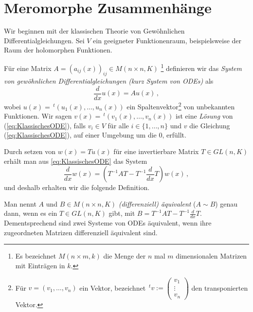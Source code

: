 \chapter{Meromorphe Zusammenhänge}
\begin{comment}
Sei $\cM$ ein $\cD$-Modul ungleich Null von endlichem Typ. Falls die
links-Multiplikation mit $x$ bijektiv ist, so nennen wir $\cM$ einen
meromorphen Zusammenhang. \cite[Chap 4]{sabbah_cimpa90}
\end{comment}

\begin{comment}
\cite[Chap 5.1.1]{hotta2007d} %
\end{comment}
Wir beginnen mit der klassischen Theorie von Gewöhnlichen
Differentialgleichungen.
Sei $V$ ein geeigneter Funktionenraum, beispielsweise der Raum der holomorphen
Funktionen.
\begin{defn}
Für eine Matrix $A=(a_{ij}(x))_{ij}\in M(n\times n,K)$
\footnote{
Es bezeichnet $M(n\times m,k)$ die Menge der $n$ mal
$m$ dimensionalen Matrizen mit Einträgen in $k$.
}
definieren wir das
\emph{System von gewöhnlichen Differentialgleichungen (kurz System von ODEs)}
als
\begin{equation}
\label{eq:KlassischesODE}
\frac{d}{dx}u(x)=Au(x) \,,
\end{equation}
wobei $u(x)=\,^t(u_1(x),\dots,u_n(x))$ ein
Spaltenvektor\footnote{Für $v=(v_1,\dots,v_n)$ ein Vektor, bezeichnet
$ \,^tv:= \begin{pmatrix} v_{1}\\ \vdots\\ v_{n} \end{pmatrix} $
den transponierten Vektor.} von unbekannten Funktionen.
Wir sagen $v(x)=\,^t(v_1(x),\dots,v_n(x))$ ist eine \emph{Lösung} von
(\ref{eq:KlassischesODE}), falls $ v_i\in V$ für alle
$i\in\{1,\dots,n\}$ und $v$ die Gleichung (\ref{eq:KlassischesODE}), auf einer
Umgebung um die $0$, erfüllt.
\end{defn}

Durch setzen von $w(x)=Tu(x)$ für eine invertierbare Matrix $T\in GL(n,K)$
erhält man aus \ref{eq:KlassischesODE} das System 
\[
\frac{d}{dx}w(x)=(T^{-1}AT - T^{-1}\frac{d}{dx}T)w(x) \,,
\]
und deshalb erhalten wir die folgende Definition.
\begin{defn}
Man nennt $A$ und $B\in M(n\times n,K)$ \emph{(differenziell) äquivalent}
($A\sim B$) genau dann, wenn es ein $T\in GL(n,K)$ gibt, mit
$B=T^{-1}AT-T^{-1}\frac{d}{dx}T$.
Dementsprechend sind zwei Systeme von ODEs äquivalent, wenn ihre zugeordneten
Matrizen differenziell äquivalent sind.
\end{defn}

